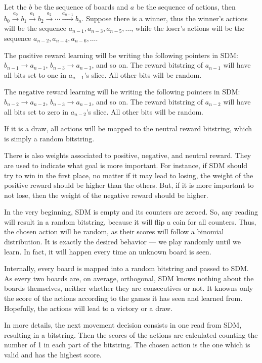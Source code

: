 Let the $b$ be the sequence of boards and $a$ be the sequence of actions, then $b_0 \xrightarrow{a_0} b_1 \xrightarrow{a_1} b_2 \xrightarrow{a_2} \cdots \xrightarrow{a_{n-1}} b_n$. Suppose there is a winner, thus the winner's actions will be the sequence $a_{n-1}, a_{n-3}, a_{n-5}, \dots$, while the loser's actions will be the sequence $a_{n-2}, a_{n-4}, a_{n-6}, \dots$.

The positive reward learning will be writing the following pointers in SDM: $b_{n-1} \rightarrow a_{n-1}$, $b_{n-3} \rightarrow a_{n-3}$, and so on. The reward bitstring of $a_{n-1}$ will have all bits set to one in $a_{n-1}$'s slice. All other bits will be random.

The negative reward learning will be writing the following pointers in SDM: $b_{n-2} \rightarrow a_{n-2}$, $b_{n-3} \rightarrow a_{n-3}$, and so on. The reward bitstring of $a_{n-2}$ will have all bits set to zero in $a_{n-2}$'s slice. All other bits will be random.

If it is a draw, all actions will be mapped to the neutral reward bitstring, which is simply a random bitstring.

There is also weights associated to positive, negative, and neutral reward. They are used to indicate what goal is more important. For instance, if SDM should try to win in the first place, no matter if it may lead to losing, the weight of the positive reward should be higher than the others. But, if it is more important to not lose, then the weight of the negative reward should be higher.

In the very beginning, SDM is empty and its counters are zeroed. So, any reading will result in a random bitstring, because it will flip a coin for all counters. Thus, the chosen action will be random, as their scores will follow a binomial distribution. It is exactly the desired behavior --- we play randomly until we learn. In fact, it will happen every time an unknown board is seen.

Internally, every board is mapped into a random bitstring and passed to SDM. As every two boards are, on average, orthogonal, SDM knows nothing about the boards themselves, neither whether they are consecutives or not. It knowns only the score of the actions according to the games it has seen and learned from. Hopefully, the actions will lead to a victory or a draw.

In more details, the next movement decision consists in one read from SDM, resulting in a bitstring. Then the scores of the actions are calculated counting the number of 1 in each part of the bitstring. The chosen action is the one which is valid and has the highest score.


